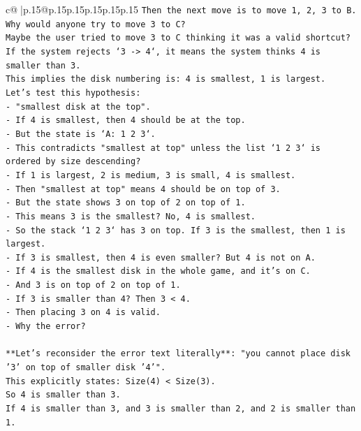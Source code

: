 \documentclass{article}
\begin{document}
{\begin{supertabular}{c@{$\;$}|p{.15\linewidth}@{}p{.15\linewidth}p{.15\linewidth}p{.15\linewidth}p{.15\linewidth}p{.15\linewidth}}
{{{\texttt{Then the next move is to move 1, 2, 3 to B.} \\
\texttt{Why would anyone try to move 3 to C?} \\
\texttt{Maybe the user tried to move 3 to C thinking it was a valid shortcut?} \\
\texttt{If the system rejects `3 {-}> 4`, it means the system thinks 4 is smaller than 3.} \\
\texttt{This implies the disk numbering is: 4 is smallest, 1 is largest.} \\
\texttt{Let's test this hypothesis:} \\
\texttt{{-} "smallest disk at the top".} \\
\texttt{{-} If 4 is smallest, then 4 should be at the top.} \\
\texttt{{-} But the state is `A: 1 2 3`.} \\
\texttt{{-} This contradicts "smallest at top" unless the list `1 2 3` is ordered by size descending?} \\
\texttt{{-} If 1 is largest, 2 is medium, 3 is small, 4 is smallest.} \\
\texttt{{-} Then "smallest at top" means 4 should be on top of 3.} \\
\texttt{{-} But the state shows 3 on top of 2 on top of 1.} \\
\texttt{{-} This means 3 is the smallest? No, 4 is smallest.} \\
\texttt{{-} So the stack `1 2 3` has 3 on top. If 3 is the smallest, then 1 is largest.} \\
\texttt{{-} If 3 is smallest, then 4 is even smaller? But 4 is not on A.} \\
\texttt{{-} If 4 is the smallest disk in the whole game, and it's on C.} \\
\texttt{{-} And 3 is on top of 2 on top of 1.} \\
\texttt{{-} If 3 is smaller than 4? Then 3 < 4.} \\
\texttt{{-} Then placing 3 on 4 is valid.} \\
\texttt{{-} Why the error?} \\
\\ 
\texttt{**Let's reconsider the error text literally**: "you cannot place disk '3' on top of smaller disk '4'".} \\
\texttt{This explicitly states: Size(4) < Size(3).} \\
\texttt{So 4 is smaller than 3.} \\
\texttt{If 4 is smaller than 3, and 3 is smaller than 2, and 2 is smaller than 1.} \\
}}}
\end{supertabular}}
\end{document}

